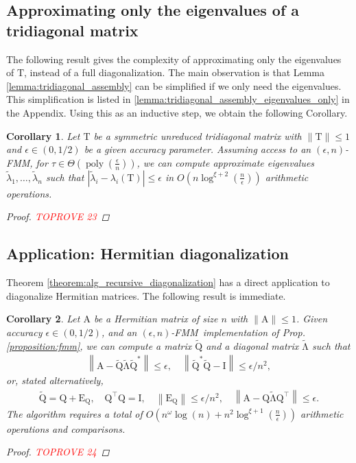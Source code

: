 \documentclass{article}
\newcommand{\lnorm}{\left\|}
\newcommand{\rnorm}{\right\|}
\newcommand{\lpar}{\left(}
\newcommand{\rpar}{\right)}
\newtheorem{corollary}{Corollary}[section]
\DeclareMathOperator{\poly}{poly}
\newcommand\matA{\boldsymbol{\mathrm{A}}}
\newcommand\matE{\boldsymbol{\mathrm{E}}}
\newcommand\matI{\boldsymbol{\mathrm{I}}}
\newcommand\matQ{\boldsymbol{\mathrm{Q}}}
\newcommand\matT{\boldsymbol{\mathrm{T}}}
\newcommand\matQtilde{\widetilde{\boldsymbol{\mathrm{Q}}}}
\newcommand\matLambdatilde{\widetilde{\boldsymbol{\mathrm{\Lambda}}}}
\newcommand{\cfmm}{\xi}
\newcommand{\fmmalgo}{FMM} \usepackage[utf8]{inputenc}
\begin{document}
\subsection{Approximating only the eigenvalues of a tridiagonal matrix}
The following result gives the complexity of approximating only the eigenvalues of $\matT$, instead of a full diagonalization. 
The main observation is that Lemma \ref{lemma:tridiagonal_assembly} can be simplified if we only need the eigenvalues. This simplification is listed in \ref{lemma:tridiagonal_assembly_eigenvalues_only} in the Appendix.
Using this as an inductive step, we obtain the following Corollary.
\begin{corollary}
    \label{corollary:tridiagonal_eigenvalues}
    Let $\matT$ be a symmetric unreduced tridiagonal matrix with $\|\matT\|\leq 1$ and $\epsilon\in(0,1/2)$ be a given accuracy parameter. Assuming access to an $(\epsilon,n)$-\fmmalgo, for $\tau\in\Theta(\poly(\tfrac{\epsilon}{n}))$, we can compute approximate eigenvalues $\widetilde\lambda_1,\ldots,\widetilde\lambda_n$ such that
    $|\widetilde\lambda_i-\lambda_i(\matT)|\leq \epsilon$ in $O\lpar n\log^{\cfmm+2}(\tfrac{n}{\epsilon})\rpar$ arithmetic operations.
    \begin{proof}\textcolor{red}{TOPROVE 23}\end{proof}
\end{corollary}

\subsection{Application: Hermitian diagonalization}
\label{appendix:hermitian_diagonalization_analysis}
Theorem \ref{theorem:alg_recursive_diagonalization} has a direct application to diagonalize Hermitian matrices. The following result is immediate.
\begin{corollary}
    \label{corollary:hermitian_diagonalization_appendix}
    Let $\matA$ be a Hermitian matrix of size $n$ with $\|\matA\|\leq 1$. Given accuracy $\epsilon\in(0,1/2)$, and an $(\epsilon,n)$-\fmmalgo\   implementation of Prop. \ref{proposition:fmm}, we can compute a matrix $\matQtilde$ and a diagonal matrix $\matLambdatilde$ such that
    \begin{align*}
        \lnorm \matA - \matQtilde\matLambdatilde\matQtilde^* \rnorm \leq \epsilon,
        \quad
        \lnorm \matQtilde^* \matQtilde - \matI \rnorm \leq \epsilon/n^2,
    \end{align*}
    or, stated alternatively,
    \begin{align*}
        \matQtilde=\matQ+\matE_{\matQ},
        \quad
        \matQ^\top\matQ=\matI,
        \quad
        \lnorm \matE_{\matQ} \rnorm \leq \epsilon/n^2,
        \quad
        \lnorm \matA - \matQ\matLambdatilde\matQ^\top \rnorm \leq \epsilon.
    \end{align*}
    The algorithm requires a total of $O\lpar n^\omega\log(n) + n^2\log^{\cfmm+1}(\tfrac{n}{\epsilon})\rpar$ arithmetic operations and comparisons.
    \begin{proof}\textcolor{red}{TOPROVE 24}\end{proof}
\end{corollary}
\end{document}
